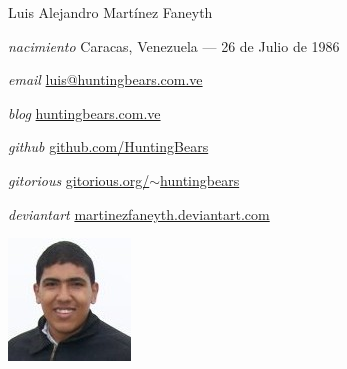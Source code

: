 \documentclass[11pt,letterpaper]{article}
\begin{document}
\begin{cv}{Luis Alejandro Mart\'inez Faneyth}
\vspace{1em}

\begin{minipage}{.7\linewidth}
\begin{cvlist}{}
\item[\textit{\large{nacimiento}}]{Caracas, Venezuela --- 26 de Julio de 1986}
\item[\textit{\large{email}}]{\href{mailto:luis@huntingbears.com.ve}{luis@huntingbears.com.ve}}
\item[\textit{\large{blog}}]{\href{http://huntingbears.com.ve/}{huntingbears.com.ve}}
\item[\textit{\large{github}}]{\href{http://github.com/HuntingBears}{github.com/HuntingBears}}
\item[\textit{\large{gitorious}}]{\href{http://gitorious.org/~huntingbears}{gitorious.org/$\sim$huntingbears}}
\item[\textit{\large{deviantart}}]{\href{http://martinezfaneyth.deviantart.com/}{martinezfaneyth.deviantart.com}}
\end{cvlist}
\end{minipage}
\begin{minipage}{.3\linewidth}
\includegraphics{curriculumvitae.jpg}
\end{minipage}
\vspace{1em}


\end{cv}
\end{document}
